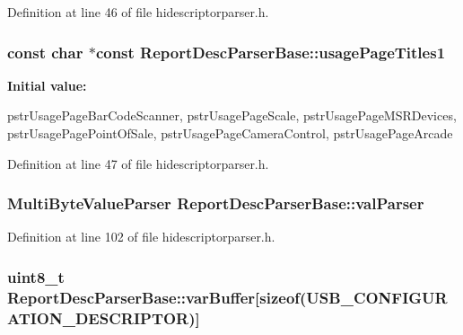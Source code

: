 \-Definition at line 46 of file hidescriptorparser.\-h.

\hypertarget{class_report_desc_parser_base_ae6dadd42986663f261aac948d24911a6}{
\subsubsection[{usage\-Page\-Titles1}]{\setlength{\rightskip}{0pt plus 5cm}const char $\ast$const {\bf \-Report\-Desc\-Parser\-Base\-::usage\-Page\-Titles1}}}\label{class_report_desc_parser_base_ae6dadd42986663f261aac948d24911a6}
{\bfseries \-Initial value\-:}
\begin{DoxyCode}
 {
        pstrUsagePageBarCodeScanner,
        pstrUsagePageScale,
        pstrUsagePageMSRDevices,
        pstrUsagePagePointOfSale,
        pstrUsagePageCameraControl,
        pstrUsagePageArcade
}
\end{DoxyCode}


\-Definition at line 47 of file hidescriptorparser.\-h.

\hypertarget{class_report_desc_parser_base_a8833e671168779d081e7f50e579bc206}{
\subsubsection[{val\-Parser}]{\setlength{\rightskip}{0pt plus 5cm}\-Multi\-Byte\-Value\-Parser {\bf \-Report\-Desc\-Parser\-Base\-::val\-Parser}}}\label{class_report_desc_parser_base_a8833e671168779d081e7f50e579bc206}


\-Definition at line 102 of file hidescriptorparser.\-h.

\hypertarget{class_report_desc_parser_base_a82cde32720eba596e5864fe7d541ea13}{
\subsubsection[{var\-Buffer}]{\setlength{\rightskip}{0pt plus 5cm}uint8\-\_\-t {\bf \-Report\-Desc\-Parser\-Base\-::var\-Buffer}\mbox{[}sizeof(\-U\-S\-B\-\_\-\-C\-O\-N\-F\-I\-G\-U\-R\-A\-T\-I\-O\-N\-\_\-\-D\-E\-S\-C\-R\-I\-P\-T\-O\-R)\mbox{]}}}\label{class_report_desc_parser_base_a82cde32720eba596e5864fe7d541ea13}


